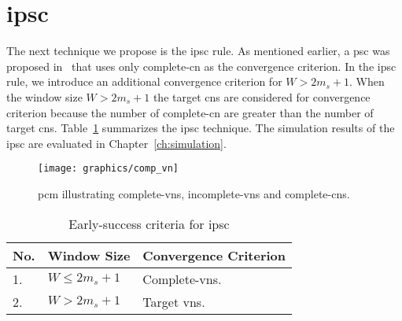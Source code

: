 \section{\acrlong{ipsc}}
The next technique we propose is the \gls{ipsc} rule. As mentioned earlier, a \gls{psc} was proposed in~\cite{Kang2018} that uses only complete-\gls{cn} as the convergence criterion. In the \gls{ipsc} rule, we introduce an additional convergence criterion for $W>2m_s+1$. When the window size $W>2m_s+1$ the target \glspl{cn} are considered for convergence criterion because the number of complete-\gls{cn} are greater than the number of target \glspl{cn}. Table~\ref{tab:ipsc} summarizes the \gls{ipsc} technique. The simulation results of the \gls{ipsc} are evaluated in Chapter~\ref{ch:simulation}.
\begin{figure}[htbp]
  \centering
  \texttt{[image: graphics/comp\_vn]}
  \caption{\gls{pcm} illustrating complete-\glspl{vn}, incomplete-\glspl{vn} and complete-\glspl{cn}.}
  \label{fig:comp_vn}
\end{figure}

\begin{table}[htbp]
\centering
\begin{tabular}{|l|l|l|}
  \hline
  \textbf{No.} &\textbf{Window Size} &\textbf{Convergence Criterion}\\
  \hline
  \hline
  1. &$W\leq2m_s+1$ &Complete-\glspl{vn}.\\
  \hline
  2. &$W>2m_s+1$ &Target \glspl{vn}.\\
  \hline
\end{tabular}
\caption{Early-success criteria for \gls{ipsc}}
\label{tab:ipsc}
\end{table}